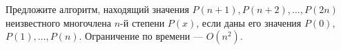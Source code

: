 \documentclass{article}
\begin{document}
Предложите алгоритм, находящий значения $P(n+1), P(n+2), \ldots ,P(2n)$ неизвестного многочлена $n$-й степени $P(x)$, если даны его значения $P(0)$, $P(1), \ldots, P(n)$. Ограничение по времени --- $O(n^2)$.
\end{document}
